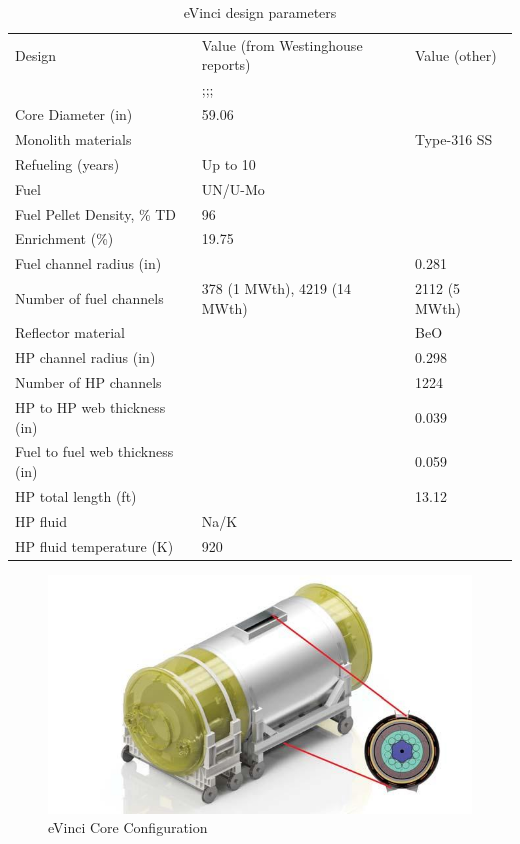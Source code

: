 \begin{table} [ht]
\begin{center}

\caption{eVinci design parameters}
\begin{tabular}{l  l  l}
\hline
Design 		&Value (from Westinghouse reports) 		& Value (other) \cite{hernandez_micro_2019}\\ 
	& 	\cite{iaea_advances_2018};\cite{levinsky_westinghouse_2018};\cite{yan_technology_2020};\cite{arafat_evinci_2019} 	&  \\ 
\hline
Core Diameter (in) 		&59.06 		&  \\ 
Monolith materials 		& 		& Type-316 SS	\\ 
Refueling (years) 		&Up to 10 		&  \\ 
Fuel 		&UN/U-Mo 		& 	 \\ 
Fuel Pellet Density, \% TD 		&96 		&  \\ 
Enrichment (\%) 		&19.75 		&  \\ 
Fuel channel radius (in) 		& 		& 0.281 \\ 
Number of fuel channels 		&378 (1 MWth), 4219 (14 MWth)		& 2112 (5 MWth) \\ 
Reflector material 		&		& BeO\\ 
\gls{HP} channel radius (in) 		&		& 0.298\\ 
Number of HP channels 		& 		& 1224\\ 
HP to HP web thickness (in) 		& 		& 0.039\\ 
Fuel to fuel web thickness (in) 		& 		& 0.059\\ 
HP total length (ft) 		&		& 13.12\\ 
HP fluid 		&Na/K		& \\ 
HP fluid temperature (K) 		&920 		& \\ 
\hline

\end{tabular}
\end{center}
\end{table}

\begin{figure}[hbtp]
\centering
\includegraphics[scale=0.5]{Figs/evincicore.jpeg}
\caption{eVinci Core Configuration}
\label{eVincidesign}
\end{figure}


